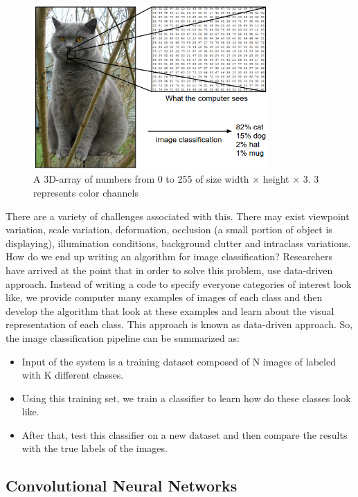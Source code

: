 \begin{figure}[H]
	\centering
	\captionsetup{justification=centering,margin=2cm}
	\includegraphics[width=0.80\textwidth]{CHAPTERS/Chapter-2/Images/2.6.png}
	\caption{A 3D-array of numbers from 0 to 255 of size width $\times$ height $\times$ 3. 3 represents color channels}
	\label{fig:2.6}
\end{figure}

There are a variety of challenges associated with this. There 
may exist viewpoint variation, scale variation, deformation, occlusion (a small portion 
of object is displaying), illumination conditions, background clutter and intraclass 
variations. How do we end up writing an algorithm for image classification? Researchers have 
arrived at the point that in order to solve this problem, use data-driven approach. Instead 
of writing a code to specify everyone categories of interest look like, we provide computer 
many examples of images of each class and then develop the algorithm that look at these 
examples and learn about the visual representation of each class. This approach is known 
as data-driven approach. So, the image classification pipeline can be summarized as:

\begin{itemize}
\item Input of the system is a training dataset composed 
of N images of labeled with K different classes.
\item Using this training set, we train a classifier to learn how do these classes look like.
\item After that, test this classifier on a new dataset and then compare the results with the true labels of the images.
\end{itemize}

\subsection{Convolutional Neural Networks}

